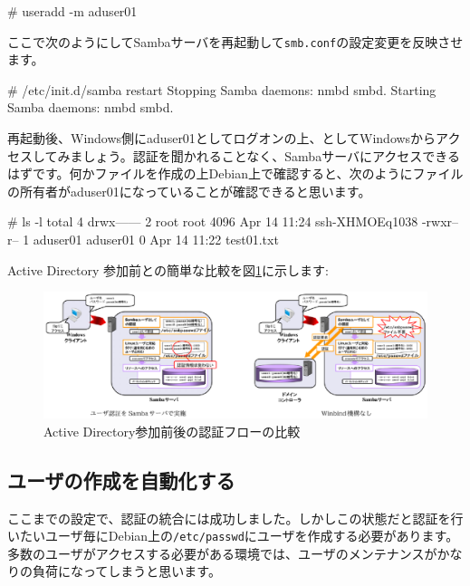 \documentclass[mingoth,a4paper]{jsarticle}
\begin{document}
\begin{commandline}
# useradd -m aduser01
\end{commandline}

ここで次のようにしてSambaサーバを再起動して{\tt{smb.conf}}の設定変更を反映させます。

\begin{commandline}
# /etc/init.d/samba restart
Stopping Samba daemons: nmbd smbd.
Starting Samba daemons: nmbd smbd.
\end{commandline}

再起動後、Windows側にaduser01としてログオンの上、{\yen}{\yen}{}{}{}{}としてWindowsからアクセスしてみましょう。認証を聞かれることなく、Sambaサーバにアクセスできるはずです。何かファイルを作成の上Debian上で確認すると、次のようにファイルの所有者がaduser01になっていることが確認できると思います。

\begin{commandline}
# ls -l
total 4
drwx------ 2 root     root     4096 Apr 14 11:24 ssh-XHMOEq1038
-rwxr--r-- 1 aduser01 aduser01    0 Apr 14 11:22 test01.txt
\end{commandline}

Active Directory 参加前との簡単な比較を図\ref{fig:monyo-winbind0.eps}に示します:

\begin{figure}[h]
\begin{center}
\includegraphics[width=0.8\hsize]{image201304/samba/monyo-winbind0.eps}
\end{center}
\caption{Active Directory参加前後の認証フローの比較}
\label{fig:monyo-winbind0.eps}
\end{figure}

\subsection{ユーザの作成を自動化する}

ここまでの設定で、認証の統合には成功しました。しかしこの状態だと認証を行いたいユーザ毎にDebian上の{\tt{/etc/passwd}}にユーザを作成する必要があります。多数のユーザがアクセスする必要がある環境では、ユーザのメンテナンスがかなりの負荷になってしまうと思います。
\end{document}
